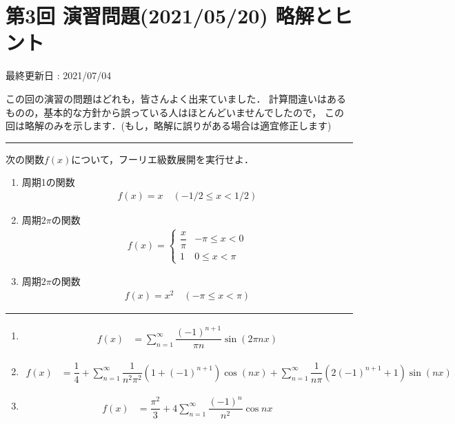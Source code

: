 \documentclass[11pt,a4]{jsarticle}
\numberwithin{equation}{section}
\begin{document}
\section*{第3回 演習問題(2021/05/20) 略解とヒント}
%
\begin{flushright}
 最終更新日 : 2021/07/04 
\end{flushright}
%
この回の演習の問題はどれも，皆さんよく出来ていました．
計算間違いはあるものの，基本的な方針から誤っている人はほとんどいませんでしたので，
この回は略解のみを示します．(もし，略解に誤りがある場合は適宜修正します)
%
\vspace*{.2cm}
%
\hrule
\vspace*{.2cm}
\enshu
%
次の関数$f(x)$について，フーリエ級数展開を実行せよ．
\begin{enumerate}[(1)]
  \item 周期1の関数 
	\begin{align*}
	  f(x)=x \quad (-1/2\leq x < 1/2)
	\end{align*}
  \item 周期$2\pi$の関数 
	\begin{align*}
	  f(x) = 
	  \begin{cases}
	    \dfrac{x}{\pi} & -\pi \leq x < 0 \\
            1              & 0 \leq x < \pi 
	  \end{cases}
	\end{align*}
  \item 周期$2\pi$の関数
	\begin{align*}
	  f(x) = x^2\quad (-\pi \leq x < \pi)
	\end{align*}
\end{enumerate}
%
\hrule
\vspace*{.2cm}
%
\begin{enumerate}[(1)]
  \item
    \begin{align*}
      f\left(x\right) & =\sum_{n=1}^{\infty}\dfrac{\left(-1\right)^{n+1}}{\pi n}\sin\left(2\pi nx\right)
    \end{align*}
  \item
    \begin{align*}
      f\left(x\right) & =\dfrac{1}{4}+\sum_{n=1}^{\infty}\dfrac{1}{n^{2}\pi^{2}}\left(1+\left(-1\right)^{n+1}\right)\cos\left(nx\right)+\sum_{n=1}^{\infty}\dfrac{1}{n\pi}\left(2\left(-1\right)^{n+1}+1\right)\sin\left(nx\right)
    \end{align*}
  \item 
    \begin{align*}
      f\left(x\right) & =\dfrac{\pi^{2}}{3}+4\sum_{n=1}^{\infty}\dfrac{\left(-1\right)^{n}}{n^{2}}\cos nx
    \end{align*} 
\end{enumerate}
\end{document}
